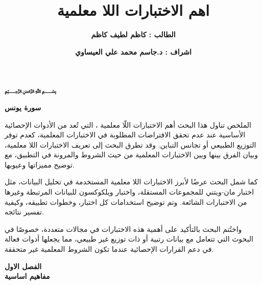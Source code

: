 

\title{\textbf{اهم الاختبارات اللا معلمية}}
\author{\textbf{الطالب : كاظم لطيف كاظم}}
\date{\textbf{اشراف : د.جاسم محمد علي العيساوي}}


	\abovedisplayskip=7pt
	\belowdisplayskip=7pt
	\maketitle	
	\begin{frame}
		\begin{huge}
			\begin{center}
				\bfseries
				﷽\\
				\vspace{15pt}
				\quranayah[10][10][8]
			\end{center}
			\begin{flushleft}
				\textbf{سورة يونس}
			\end{flushleft}
		\end{huge}
	\end{frame}
	
		\timesfont
		
		\begin{frame}{الملخص}
			تناول هذا البحث أهم الاختبارات اللّا معلمية 
			، التي تُعد من الأدوات الإحصائية الأساسية عند عدم تحقق الافتراضات المطلوبة في الاختبارات المعلمية، كعدم توفر التوزيع الطبيعي أو تجانس التباين. وقد تطرق البحث إلى تعريف الاختبارات اللا معلمية، وبيان الفرق بينها وبين الاختبارات المعلمية من حيث الشروط والمرونة في التطبيق، مع توضيح مميزاتها وعيوبها.
			
			كما شمل البحث عرضًا لأبرز الاختبارات اللا معلمية المستخدمة في تحليل البيانات، مثل اختبار مان-ويتني 
			 للمجموعات المستقلة، واختبار ويلكوكسون  للبيانات المرتبطة وغيرها من الاختبارات الشائعة. وتم توضيح استخدامات كل اختبار، وخطوات تطبيقه، وكيفية تفسير نتائجه.
			
			واختُتم البحث بالتأكيد على أهمية هذه الاختبارات في مجالات متعددة، خصوصًا في البحوث التي تتعامل مع بيانات رتبية أو ذات توزيع غير طبيعي، مما يجعلها أدوات فعالة في دعم القرارات الإحصائية عندما تكون الشروط المعلمية غير متحققة.
		\end{frame}
		
		\begin{frame}
			\Huge
			\begin{center}
				\textbf{الفصل الاول}\\
				\textbf{مفاهيم اساسية}
			\end{center}
		\end{frame}
		
